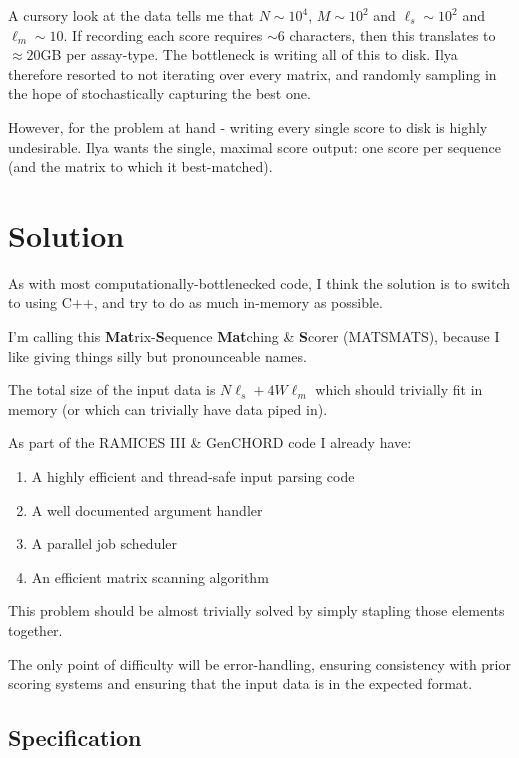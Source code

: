 \documentclass[a4paper,9pt]{article}
\begin{document}
		A cursory look at the data tells me that $N\sim 10^4$, $M \sim 10^2$ and $\ell_s\sim10^2$ and $\ell_m \sim 10$. If recording each score requires $\sim 6$ characters, then this translates to $\approx 20$GB per assay-type. The bottleneck is writing all of this to disk. Ilya therefore resorted to not iterating over every matrix, and randomly sampling in the hope of stochastically capturing the best one.

		However, for the problem at hand - writing every single score to disk is highly undesirable. Ilya wants the single, maximal score output: one score per sequence (and the matrix to which it best-matched). 




	\section{Solution}

		As with most computationally-bottlenecked code, I think the solution is to switch to using C++, and try to do as much in-memory as possible. 

		I'm calling this \textbf{Mat}rix-\textbf{S}equence \textbf{Mat}ching \& \textbf{S}corer (MATSMATS), because I like giving things silly but pronounceable names. 

		The total size of the input data is $N\ell_s + 4W\ell_m$ which should trivially fit in memory (or which can trivially have data piped in).

		As part of the RAMICES III \& GenCHORD code I already have:
		\begin{enumerate}
			\item A highly efficient and thread-safe input parsing code
			\item A well documented argument handler
			\item A parallel job scheduler 
			\item An efficient matrix scanning algorithm
		\end{enumerate}

		This problem should be almost trivially solved by simply stapling those elements together. 

		The only point of difficulty will be error-handling, ensuring consistency with prior scoring systems and ensuring that the input data is in the expected format. 

		\subsection{Specification}
\end{document}
